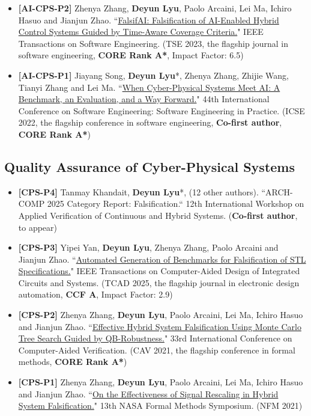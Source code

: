 \documentclass[11pt,a4paper]{moderncv}        %
\newcommand{\highlight}[1]{\textcolor{deepPurple}{\textbf{#1}}}
\begin{document}
\begin{itemize}
    \item \hypertarget{pub:AI-CPS-P2}{}\textbf{[AI-CPS-P2]} Zhenya Zhang, \textbf{Deyun Lyu}, Paolo Arcaini, Lei Ma, Ichiro Hasuo and Jianjun Zhao. ``\href{https://ieeexplore.ieee.org/document/9844247}{FalsifAI: Falsification of AI-Enabled Hybrid Control Systems Guided by Time-Aware Coverage Criteria.}" IEEE Transactions on Software Engineering. (TSE 2023, the flagship journal in software engineering, \highlight{CORE Rank A*}, Impact Factor: 6.5)
    \item \hypertarget{pub:AI-CPS-P1}{}\textbf{[AI-CPS-P1]} Jiayang Song, \textbf{Deyun Lyu}*, Zhenya Zhang, Zhijie Wang, Tianyi Zhang and Lei Ma. ``\href{https://dl.acm.org/doi/10.1145/3510457.3513049}{When Cyber-Physical Systems Meet AI: A Benchmark, an Evaluation, and a Way Forward.}" 44th International Conference on Software Engineering: Software Engineering in Practice. (ICSE 2022, the flagship conference in software engineering, \highlight{Co-first author}, \highlight{CORE Rank A*})
\end{itemize}

\subsection{Quality Assurance of Cyber-Physical Systems}

\begin{itemize}
    \item \textbf{[CPS-P4]} Tanmay Khandait, \textbf{Deyun Lyu}*, (12 other authors). ``ARCH-COMP 2025 Category Report: Falsification.`` 12th International Workshop on Applied Verification of Continuous and Hybrid Systems. (\highlight{Co-first author}, to appear)
    \item \hypertarget{pub:CPS-P3}{}\textbf{[CPS-P3]} Yipei Yan, \textbf{Deyun Lyu}, Zhenya Zhang, Paolo Arcaini and Jianjun Zhao. ``\href{https://ieeexplore.ieee.org/document/10922764}{Automated Generation of Benchmarks for Falsification of STL Specifications.}" IEEE Transactions on Computer-Aided Design of Integrated Circuits and Systems. (TCAD 2025, the flagship journal in electronic design automation, \highlight{CCF A}, Impact Factor: 2.9)
    \item \hypertarget{pub:CPS-P2}{}\textbf{[CPS-P2]} Zhenya Zhang, \textbf{Deyun Lyu}, Paolo Arcaini, Lei Ma, Ichiro Hasuo and Jianjun Zhao. ``\href{https://link.springer.com/chapter/10.1007/978-3-030-81685-8_29}{Effective Hybrid System Falsification Using Monte Carlo Tree Search Guided by QB-Robustness.}" 33rd International Conference on Computer-Aided Verification. (CAV 2021, the flagship conference in formal methods, \highlight{CORE Rank A*})
    \item \textbf{[CPS-P1]} Zhenya Zhang, \textbf{Deyun Lyu}, Paolo Arcaini, Lei Ma, Ichiro Hasuo and Jianjun Zhao. ``\href{https://link.springer.com/chapter/10.1007/978-3-030-76384-8_24}{On the Effectiveness of Signal Rescaling in Hybrid System Falsification.}" 13th NASA Formal Methods Symposium. (NFM 2021)
\end{itemize}
\end{document}
